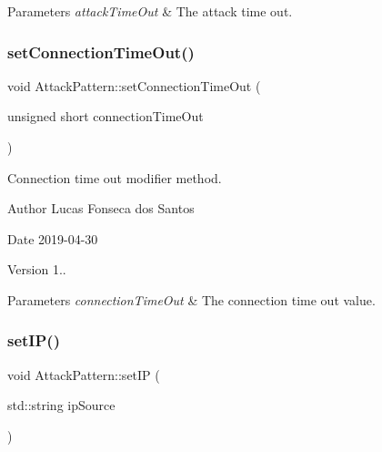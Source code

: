 \begin{DoxyParams}{Parameters}
{\em attack\+Time\+Out} & The attack time out. \\
\hline
\end{DoxyParams}
\mbox{\label{classAttackPattern_ad66776126cda5c62189f576985e96542}} 
\subsubsection{\texorpdfstring{set\+Connection\+Time\+Out()}{setConnectionTimeOut()}}
{\footnotesize\ttfamily void Attack\+Pattern\+::set\+Connection\+Time\+Out (\begin{DoxyParamCaption}\item[{unsigned short}]{connection\+Time\+Out }\end{DoxyParamCaption})}

Connection time out modifier method. \begin{DoxyAuthor}{Author}
Lucas Fonseca dos Santos 
\end{DoxyAuthor}
\begin{DoxyDate}{Date}
2019-\/04-\/30 
\end{DoxyDate}
\begin{DoxyVersion}{Version}
1..
\end{DoxyVersion}

\begin{DoxyParams}{Parameters}
{\em connection\+Time\+Out} & The connection time out value. \\
\hline
\end{DoxyParams}
\mbox{\label{classAttackPattern_a46fff75a90f6e2304ab91885bf57c1f1}} 
\subsubsection{\texorpdfstring{set\+I\+P()}{setIP()}}
{\footnotesize\ttfamily void Attack\+Pattern\+::set\+IP (\begin{DoxyParamCaption}\item[{std\+::string}]{ip\+Source }\end{DoxyParamCaption})}

